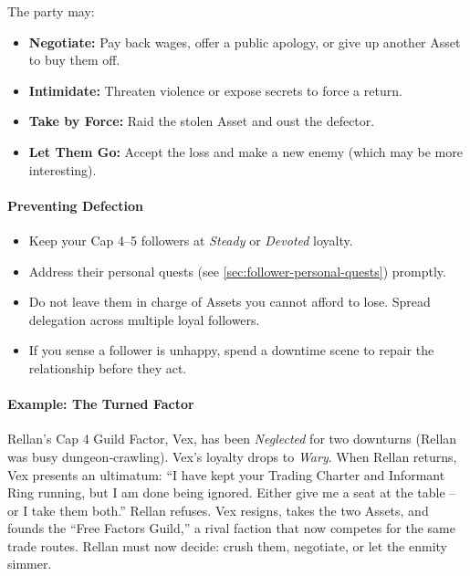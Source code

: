 The party may:
\begin{itemize}
  \item \textbf{Negotiate:} Pay back wages, offer a public apology, or give up another Asset to buy them off.
  \item \textbf{Intimidate:} Threaten violence or expose secrets to force a return.
  \item \textbf{Take by Force:} Raid the stolen Asset and oust the defector.
  \item \textbf{Let Them Go:} Accept the loss and make a new enemy (which may be more interesting).
\end{itemize}

\paragraph{Preventing Defection}
\begin{itemize}
  \item Keep your Cap 4--5 followers at \emph{Steady} or \emph{Devoted} loyalty.
  \item Address their personal quests (see \ref{sec:follower-personal-quests}) promptly.
  \item Do not leave them in charge of Assets you cannot afford to lose. Spread delegation across multiple loyal followers.
  \item If you sense a follower is unhappy, spend a downtime scene to repair the relationship before they act.
\end{itemize}

\paragraph{Example: The Turned Factor}
Rellan's Cap 4 Guild Factor, Vex, has been \emph{Neglected} for two downturns (Rellan was busy dungeon‑crawling). Vex's loyalty drops to \emph{Wary}. When Rellan returns, Vex presents an ultimatum: ``I have kept your Trading Charter and Informant Ring running, but I am done being ignored. Either give me a seat at the table -- or I take them both.'' Rellan refuses. Vex resigns, takes the two Assets, and founds the ``Free Factors Guild,'' a rival faction that now competes for the same trade routes. Rellan must now decide: crush them, negotiate, or let the enmity simmer.

